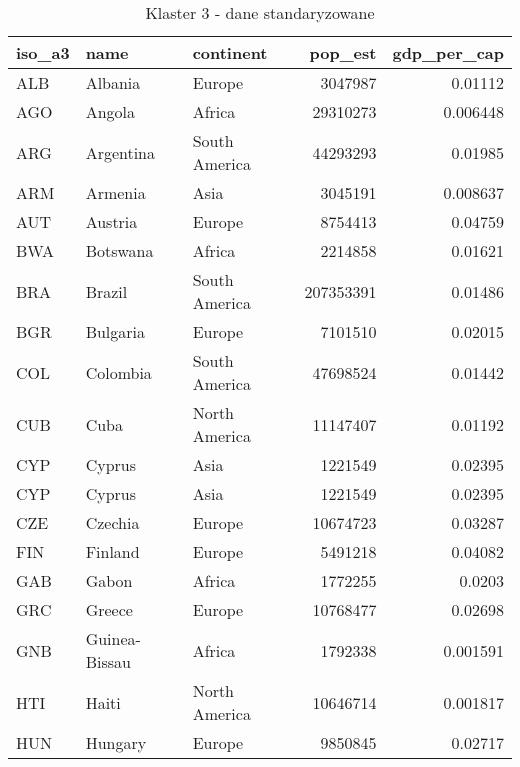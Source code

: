 \begin{table}[h!]
    \centering
    \caption{Klaster 3 - dane standaryzowane}
    \label{tab:cl3std}
    \begin{tabular}{lllrr}
        \toprule
        iso\_a3 & name          & continent     & pop\_est  & gdp\_per\_cap \\
        \midrule
        ALB     & Albania       & Europe        & 3047987   & 0.01112       \\
        AGO     & Angola        & Africa        & 29310273  & 0.006448      \\
        ARG     & Argentina     & South America & 44293293  & 0.01985       \\
        ARM     & Armenia       & Asia          & 3045191   & 0.008637      \\
        AUT     & Austria       & Europe        & 8754413   & 0.04759       \\
        BWA     & Botswana      & Africa        & 2214858   & 0.01621       \\
        BRA     & Brazil        & South America & 207353391 & 0.01486       \\
        BGR     & Bulgaria      & Europe        & 7101510   & 0.02015       \\
        COL     & Colombia      & South America & 47698524  & 0.01442       \\
        CUB     & Cuba          & North America & 11147407  & 0.01192       \\
        CYP     & Cyprus        & Asia          & 1221549   & 0.02395       \\
        CYP     & Cyprus        & Asia          & 1221549   & 0.02395       \\
        CZE     & Czechia       & Europe        & 10674723  & 0.03287       \\
        FIN     & Finland       & Europe        & 5491218   & 0.04082       \\
        GAB     & Gabon         & Africa        & 1772255   & 0.0203        \\
        GRC     & Greece        & Europe        & 10768477  & 0.02698       \\
        GNB     & Guinea-Bissau & Africa        & 1792338   & 0.001591      \\
        HTI     & Haiti         & North America & 10646714  & 0.001817      \\
        HUN     & Hungary       & Europe        & 9850845   & 0.02717       \\

\end{tabular}
\end{table}
